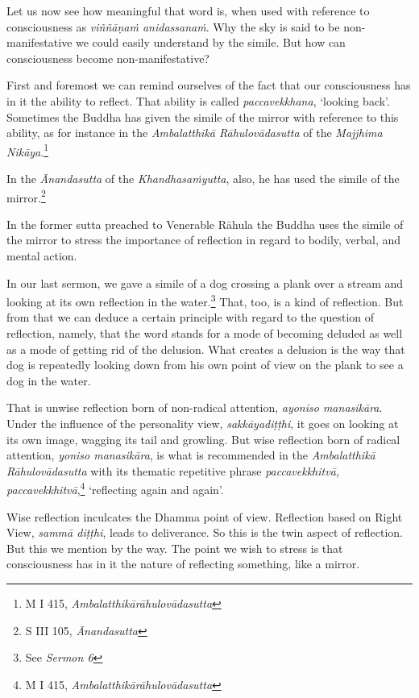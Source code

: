 Let us now see how meaningful that word is, when used with reference to consciousness as \emph{viññāṇaṁ anidassanaṁ}. Why the sky is said to be non-manifestative we could easily understand by the simile. But how can consciousness become non-manifestative?

First and foremost we can remind ourselves of the fact that our consciousness has in it the ability to reflect. That ability is called \emph{paccavekkhana}, `looking back'. Sometimes the Buddha has given the simile of the mirror with reference to this ability, as for instance in the \emph{Ambalatthikā Rāhulovādasutta} of the \emph{Majjhima Nikāya}.\footnote{M I 415, \emph{Ambalatthikārāhulovādasutta}}

In the \emph{Ānandasutta} of the \emph{Khandhasaṁyutta}, also, he has used the simile of the mirror.\footnote{S III 105, \emph{Ānandasutta}}

In the former sutta preached to Venerable Rāhula the Buddha uses the simile of the mirror to stress the importance of reflection in regard to bodily, verbal, and mental action.

In our last sermon, we gave a simile of a dog crossing a plank over a stream and looking at its own reflection in the water.\footnote{See \emph{Sermon 6}} That, too, is a kind of reflection. But from that we can deduce a certain principle with regard to the question of reflection, namely, that the word stands for a mode of becoming deluded as well as a mode of getting rid of the delusion. What creates a delusion is the way that dog is repeatedly looking down from his own point of view on the plank to see a dog in the water.

That is unwise reflection born of non-radical attention, \emph{ayoniso manasikāra}. Under the influence of the personality view, \emph{sakkāyadiṭṭhi}, it goes on looking at its own image, wagging its tail and growling. But wise reflection born of radical attention, \emph{yoniso manasikāra}, is what is recommended in the \emph{Ambalatthikā Rāhulovādasutta} with its thematic repetitive phrase \emph{paccavekkhitvā, paccavekkhitvā},\footnote{M I 415, \emph{Ambalatthikārāhulovādasutta}} `reflecting again and again'.

Wise reflection inculcates the Dhamma point of view. Reflection based on Right View, \emph{sammā diṭṭhi}, leads to deliverance. So this is the twin aspect of reflection. But this we mention by the way. The point we wish to stress is that consciousness has in it the nature of reflecting something, like a mirror.

